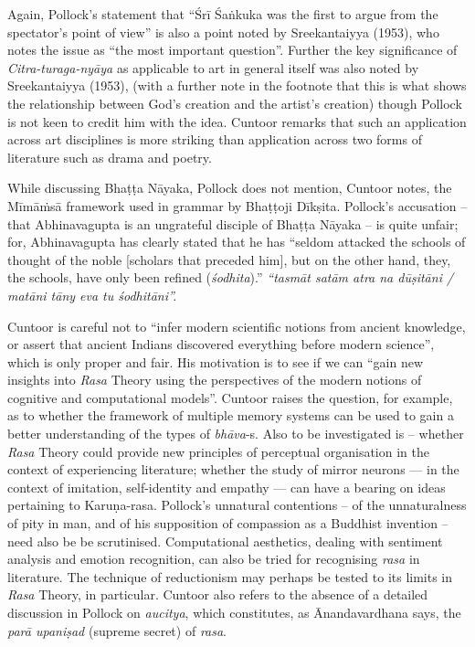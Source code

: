 Again, Pollock's statement that “Śrī Śaṅkuka was the first to argue from the spectator's point of view” is also a point noted by Sreekantaiyya (1953), who notes the issue as “the most important question”. Further the key significance of \textsl{Citra-turaga-nyāya} as applicable to art in general itself was also noted by Sreekantaiyya (1953), (with a further note in the footnote that this is what shows the relationship between God's creation and the artist's creation) though Pollock is not keen to credit him with the idea. Cuntoor remarks that such an application across art disciplines is more striking than application across two forms of literature such as drama and poetry.

While discussing Bhaṭṭa Nāyaka, Pollock does not mention, Cuntoor notes, the Mīmāṁsā framework used in grammar by Bhaṭṭoji Dīkṣita. Pollock's accusation -- that Abhinavagupta is an ungrateful disciple of Bhaṭṭa Nāyaka -- is quite unfair; for, Abhinavagupta has clearly stated that he has “seldom attacked the schools of thought of the noble [scholars that preceded him], but on the other hand, they, the schools, have only been refined (\textsl{śodhita}).” \textsl{“tasmāt satām atra na dūṣitāni / matāni tāny eva tu śodhitāni”.}

Cuntoor is careful not to “infer modern scientific notions from ancient knowledge, or assert that ancient Indians discovered everything before modern science”, which is only proper and fair. His motivation is to see if we can “gain new insights into \textsl{Rasa} Theory using the perspectives of the modern notions of cognitive and computational models”. Cuntoor raises the question, for example, as to whether the framework of multiple memory systems can be used to gain a better understanding of the types of \textsl{bhāva}-s. Also to be investigated is -- whether \textsl{Rasa} Theory could provide new principles of perceptual organisation in the context of experiencing literature; whether the study of mirror neurons --- in the context of imitation, self-identity and empathy --- can have a bearing on ideas pertaining to Karuṇa-rasa. Pollock's unnatural contentions -- of the unnaturalness of pity in man, and of his supposition of compassion as a Buddhist invention -- need also be be scrutinised. Computational aesthetics, dealing with sentiment analysis and emotion recognition, can also be tried for recognising \textsl{rasa} in literature. The technique of reductionism may perhaps be tested to its limits in \textsl{Rasa} Theory, in particular. Cuntoor also refers to the absence of a detailed discussion in Pollock on \textsl{aucitya}, which constitutes, as Ānandavardhana says, the \textsl{parā upaniṣad} (supreme secret) of \textsl{rasa}.

